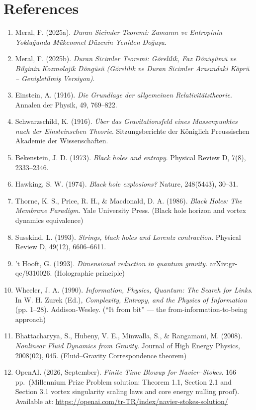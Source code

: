 \documentclass[12pt,a4paper]{article}
\begin{document}
\section*{References}

\begin{enumerate}
    \item Meral, F. (2025a). \textit{Duran Sicimler Teoremi: Zamanın ve Entropinin Yokluğunda Mükemmel Düzenin Yeniden Doğuşu}.
    \item Meral, F. (2025b). \textit{Duran Sicimler Teoremi: Görelilik, Faz Dönüşümü ve Bilginin Kozmolojik Döngüsü (Görelilik ve Duran Sicimler Arasındaki Köprü – Genişletilmiş Versiyon)}.
    \item Einstein, A. (1916). \textit{Die Grundlage der allgemeinen Relativitätstheorie}. Annalen der Physik, 49, 769–822.
    \item Schwarzschild, K. (1916). \textit{Über das Gravitationsfeld eines Massenpunktes nach der Einsteinschen Theorie}. Sitzungsberichte der Königlich Preussischen Akademie der Wissenschaften.
    \item Bekenstein, J. D. (1973). \textit{Black holes and entropy}. Physical Review D, 7(8), 2333–2346.
    \item Hawking, S. W. (1974). \textit{Black hole explosions?} Nature, 248(5443), 30–31.
    \item Thorne, K. S., Price, R. H., \& Macdonald, D. A. (1986). \textit{Black Holes: The Membrane Paradigm}. Yale University Press. (Black hole horizon and vortex dynamics equivalence)
    \item Susskind, L. (1993). \textit{Strings, black holes and Lorentz contraction}. Physical Review D, 49(12), 6606–6611.
    \item ’t Hooft, G. (1993). \textit{Dimensional reduction in quantum gravity}. arXiv:gr-qc/9310026. (Holographic principle)
    \item Wheeler, J. A. (1990). \textit{Information, Physics, Quantum: The Search for Links}. In W. H. Zurek (Ed.), \textit{Complexity, Entropy, and the Physics of Information} (pp. 1–28). Addison-Wesley. (``It from bit'' --- the from-information-to-being approach)
    \item Bhattacharyya, S., Hubeny, V. E., Minwalla, S., \& Rangamani, M. (2008). \textit{Nonlinear Fluid Dynamics from Gravity}. Journal of High Energy Physics, 2008(02), 045. (Fluid--Gravity Correspondence theorem)
    \item OpenAI. (2026, September). \textit{Finite Time Blowup for Navier--Stokes}. 166 pp.\ (Millennium Prize Problem solution: Theorem 1.1, Section 2.1 and Section 3.1 vortex singularity scaling laws and core energy nulling proof). Available at: \url{https://openai.com/tr-TR/index/navier-stokes-solution/}

\end{enumerate}
\end{document}
